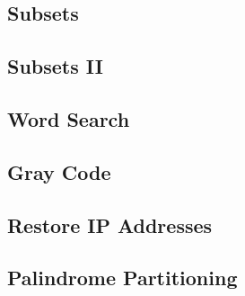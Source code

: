 \subsection{Subsets}

\subsection{Subsets II}

\subsection{Word Search}

\subsection{Gray Code}

\subsection{Restore IP Addresses}

\subsection{Palindrome Partitioning}

